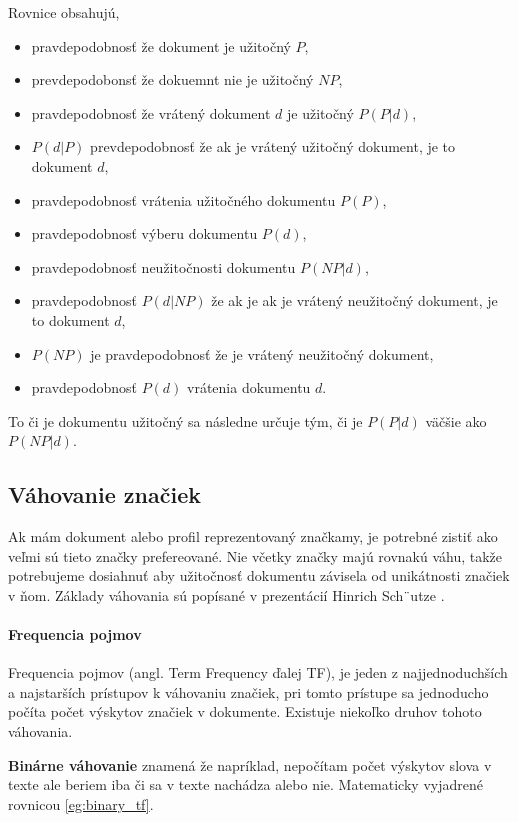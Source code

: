 Rovnice obsahujú,
\begin{itemize}
\item{pravdepodobnosť že dokument je užitočný \(P\),}
\item{prevdepodobonsť že dokuemnt nie je užitočný \(NP\),}
\item{pravdepodobnosť že vrátený dokument \(d\) je užitočný \(P(P|d)\),}
\item{\(P(d|P)\) prevdepodobnosť že ak je vrátený užitočný dokument, je to dokument \(d\),}
\item{pravdepodobnosť vrátenia užitočného dokumentu \(P(P)\),}
\item{pravdepodobnosť výberu dokumentu \(P(d)\),}
\item{pravdepodobnosť neužitočnosti dokumentu \(P(NP|d)\),}
\item{pravdepodobnosť \(P(d|NP)\) že ak je ak je vrátený neužitočný dokument,
    je to dokument \(d\),}
\item{\(P(NP)\) je pravdepodobnosť že je vrátený neužitočný dokument,}
\item{pravdepodobnosť \(P(d)\) vrátenia dokumentu \(d\).}
\end{itemize}

To či je dokumentu užitočný sa následne určuje tým, či je \(P(P|d)\) väčšie ako \(P(NP|d)\).

\subsection{Váhovanie značiek}

Ak mám dokument alebo profil reprezentovaný značkamy, je potrebné zistiť ako veľmi sú tieto 
značky prefereované. Nie včetky značky majú rovnakú váhu, takže potrebujeme dosiahnuť 
aby užitočnosť dokumentu závisela od unikátnosti značiek v ňom. Základy váhovania sú popísané 
v prezentácií Hinrich Sch¨utze \cite{vector_space_model}.

\paragraph{Frequencia pojmov}

Frequencia pojmov (angl. Term Frequency ďalej TF),
je jeden z najjednoduchších a najstarších prístupov k váhovaniu značiek,
pri tomto prístupe sa jednoducho počíta počet výskytov značiek v dokumente.
Existuje niekoľko druhov tohoto váhovania.

\textbf{Binárne váhovanie} znamená že napríklad, nepočítam počet výskytov
slova v texte ale beriem iba či sa v texte nachádza alebo nie. Matematicky
vyjadrené rovnicou \ref{eg:binary_tf}.

